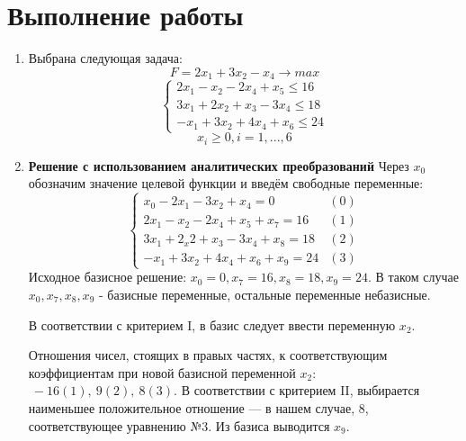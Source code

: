 \documentclass[a4paper,12pt]{article}
\begin{document}
\section{\normalsize{Выполнение работы}}
\begin{flushleft}
\justify
\begin{enumerate}
  \item Выбрана следующая задача:
    \begin{equation*}
      F = 2x_1 + 3x_2 - x_4 \rightarrow max
    \end{equation*}
    \begin{equation*}
      \begin{cases}
        2x_1 - x_2 - 2x_4 + x_5 \le 16 \\
        3x_1 + 2x_2 + x_3 - 3x_4 \le 18 \\
        -x_1 + 3x_2 + 4x_4 + x_6 \le 24
      \end{cases}
    \end{equation*}
    \begin{equation*}
      x_i \ge 0, i = 1, ..., 6
    \end{equation*}
  \item \textbf{Решение с использованием аналитических преобразований}\newline
    Через $x_0$ обозначим значение целевой функции и введём свободные переменные:
    \begin{equation*}
      \begin{cases}
        x_0 - 2x_1 - 3x_2 + x_4 = 0 & (0)\\
        2x_1 - x_2 - 2x_4 + x_5 + x_7 = 16 & (1) \\
        3x_1 + 2_x2 + x_3 - 3x_4 + x_8 = 18 & (2) \\
        -x_1 + 3x_2 + 4x_4 + x_6 + x_9 = 24 & (3)
      \end{cases}
    \end{equation*}
    Исходное базисное решение: $x_0 = 0, x_7 = 16, x_8 = 18, x_9 = 24$. В таком случае $x_0, x_7, x_8, x_9$ - базисные переменные, остальные переменные небазисные.

    В соответствии с критерием I, в базис следует ввести переменную $x_2$.

    Отношения чисел, стоящих в правых частях, к соответствующим коэффициентам при новой базисной переменной $x_2$: $~-16 (1),~9 (2),~8 (3)$. В соответствии с критерием II, выбирается наименьшее положительное отношение --- в нашем случае, 8, соответствующее уравнению №3. Из базиса выводится $x_9$.


\end{enumerate}
\end{flushleft}
\end{document}

